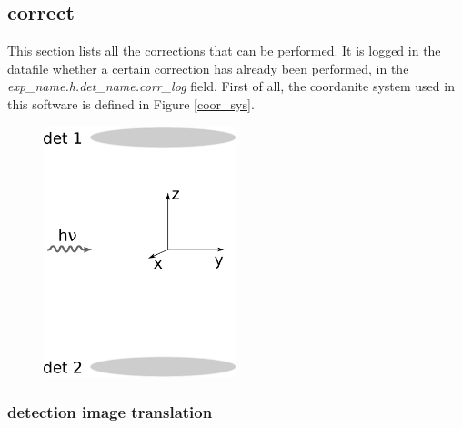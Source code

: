\newpage
\subsection{correct}
This section lists all the corrections that can be performed. It is logged in the datafile whether a certain correction has already been performed, in the \emph{exp\_name.h.det\_name.corr\_log} field.
First of all, the coordanite system used in this software is defined in Figure \ref{coor_sys}.

\begin{figure}
  \centering
  \includegraphics[width=0.5\textwidth]{Graphics/coordinate_system.eps}
  \label{fig:test1}
\end{figure}

\subsubsection{detection image translation}

